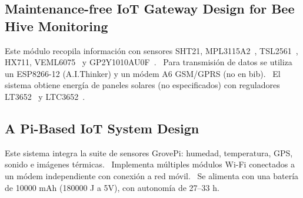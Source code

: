 \subsection{Maintenance-free IoT Gateway Design for Bee Hive Monitoring}
Este módulo recopila información con sensores SHT21, MPL3115A2~\cite{nxp_mpl3115a2}, TSL2561~\cite{tsl2561_adafruit}, HX711, VEML6075~\cite{adafruit_veml6075} y GP2Y1010AU0F~\cite{vidrascu_svasta_2017b}.~\cite{vidrascu_svasta_2017b}  
Para transmisión de datos se utiliza un ESP8266-12 (A.I.Thinker) y un módem A6 GSM/GPRS (no en bib).~\cite{vidrascu_svasta_2017b}  
El sistema obtiene energía de paneles solares (no especificados) con reguladores LT3652~\cite{lt3652_datasheet} y LTC3652~\cite{ltc3652_datasheet}.~\cite{vidrascu_svasta_2017b}

\subsection{A Pi-Based IoT System Design}
Este sistema integra la suite de sensores GrovePi: humedad, temperatura, GPS, sonido e imágenes térmicas.~\cite{chen_chien_hsu_jing_lin_lin_2020}  
Implementa múltiples módulos Wi-Fi conectados a un módem independiente con conexión a red móvil.~\cite{chen_chien_hsu_jing_lin_lin_2020}  
Se alimenta con una batería de 10000 mAh (180000 J a 5V), con autonomía de 27–33 h.~\cite{chen_chien_hsu_jing_lin_lin_2020}

